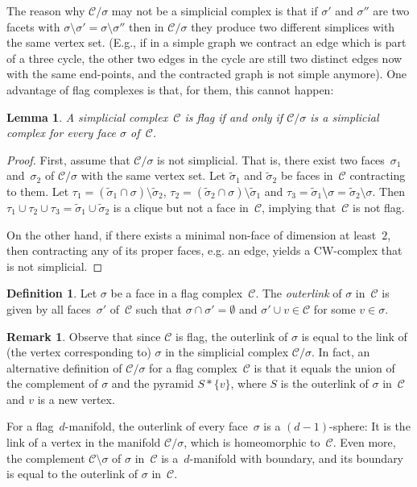 \documentclass[a4paper,12pt]{amsart}
\theoremstyle{plain}
\newtheorem{lemma}[theorem]{Lemma}
\theoremstyle{definition}
\newtheorem{definition}[theorem]{Definition}
\newtheorem{remark}[theorem]{Remark}
\newcommand{\darkred}{\color{darkred}} %
\newcommand{\C}{\mathcal C}
\newcommand{\face}{\sigma}
\newcommand{\smallface}{\tau}
\newcommand{\defn}[1]{\emph{\darkred #1}} %
\begin{document}
\medskip
The reason why $\C/\face$ may not be a simplicial complex is that
 if $\face'$ and $\face''$ are two facets with $\face \setminus \face' = \face \setminus \face''$ then in $\C/\face$ they produce two different simplices with the same vertex set.
 (E.g., if in a simple graph we contract an edge which is part of a three cycle, the other two edges in the cycle are still two distinct edges now with the same end-points, and the contracted graph is not simple anymore).
 One advantage of flag complexes is that, for them, this cannot happen:

\begin{lemma}
  \label{lem:contract}
  A simplicial complex~$\C$ is flag if and only if $\C / \face$ is a simplicial complex for every face $\face$ of~$\C$.
\end{lemma}

\begin{proof}
  First, assume that $\C/\face$ is not simplicial.
  That is, there exist two faces~$\face_1$ and~$\face_2$ of $\C/\face$ with the same vertex set.
  Let $\tilde{\face}_1$ and $\tilde{\face}_2$ be faces in~$\C$ contracting to them.
  Let $\smallface_1 = \left(\tilde{\face}_1 \cap \face \right) \setminus \tilde{\face}_2$, $\smallface_2 = \left(\tilde{\face}_2 \cap \face \right) \setminus \tilde{\face}_1$ and $\smallface_3 = \tilde{\face}_1 \setminus \face  = \tilde{\face}_2 \setminus \face$.
  Then $\smallface_1 \cup \smallface_2 \cup \smallface_3 = \tilde{\face}_1 \cup \tilde{\face}_2$ is a clique but not a face in~$\C$, implying that~$\C$ is not flag.

  On the other hand, if there exists a minimal non-face of dimension at least~$2$, then contracting any of its proper faces, e.g. an edge, yields a CW-complex that is not simplicial.
\end{proof}

\begin{definition}
  \label{def:outerlink}
  Let $\face$ be a face in a flag complex~$\C$.
  The \defn{outerlink} of $\face$ in~$\C$ is given by all faces~$\face'$ of~$\C$ such that $\face\cap\face'=\emptyset$ and $\face'\cup v\in \C$ for some $v\in \face$.
\end{definition}


\begin{remark}
Observe that since $\C$ is flag, the outerlink of $\face$ is equal to the link of (the vertex corresponding to) $\face$ in the simplicial complex $\C/\face$.
  In fact, an alternative definition of $\C/\face$ for a flag complex~$\C$ is that it equals the union of the complement of $\face$ and the pyramid $S*\{v\}$, where $S$ is the outerlink of $\face$ in~$\C$ and $v$ is a new vertex.

  For a flag~$d$-manifold, the outerlink of every face~$\face$ is a $(d-1)$-sphere: It is the link of a vertex in the manifold $\C/\face$, which is homeomorphic to~$\C$.
  Even more, the complement $\C \setminus \face$ of $\face$ in~$\C$ is a~$d$-manifold with boundary, and its boundary is equal to the outerlink of $\face$ in~$\C$.

\end{remark}
\end{document}
